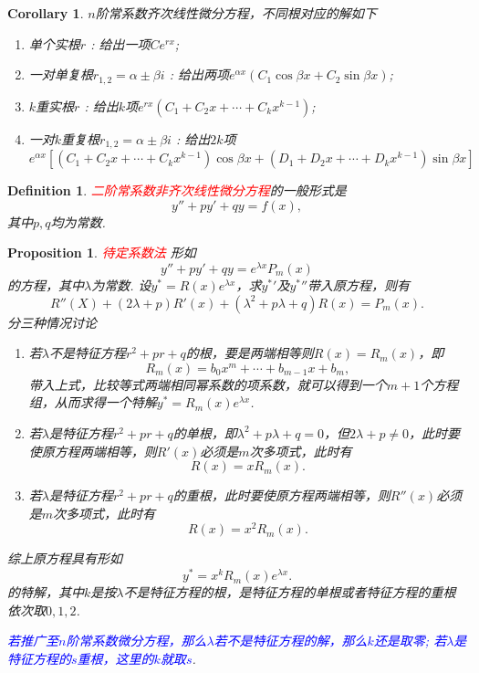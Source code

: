 \documentclass{article}
\newtheorem{corollary}[theorem]{Corollary}
\newtheorem{proposition}[theorem]{Proposition}
\newtheorem{definition}[theorem]{Definition}
\newcommand{\redt}[1]{\textcolor{red}{#1}}
\newcommand{\bluet}[1]{\textcolor{blue}{#1}}
\begin{document}
\begin{corollary}
\rm $n$阶常系数齐次线性微分方程，不同根对应的解如下
\begin{enumerate}
	\item 单个实根$r$ : 给出一项$Ce^{rx}$;
	\item 一对单复根$r_{1,2} = \alpha \pm \beta i$ : 给出两项$e^{\alpha x}(C_1\cos \beta x + C_2\sin \beta x)$;
	\item $k$重实根$r$ : 给出$k$项$e^{rx}(C_1 + C_2x + \cdots + C_kx^{k-1})$;
	\item 一对$k$重复根$r_{1,2} = \alpha \pm \beta i$ : 给出$2k$项$e^{\alpha x}[(C_1+C_2x +\cdots +C_kx^{k-1})\cos \beta x + (D_1+D_2x +\cdots +D_kx^{k-1})\sin \beta x]$
\end{enumerate}
\end{corollary}

\begin{definition}
\rm \redt{二阶常系数非齐次线性微分方程}的一般形式是
$$
y''+py' +qy = f(x),
$$
其中$p,q$均为常数. 
\end{definition}

\begin{proposition}
\rm \redt{待定系数法} 形如
$$
y''+py' +qy = e^{\lambda x}P_m(x)
$$
的方程，其中$\lambda$为常数. 设$y^* = R(x)e^{\lambda x}$，求${y^*}'$及${y^*}''$带入原方程，则有
$$
R''(X) + (2\lambda + p)R'(x) + (\lambda^2 + p\lambda +q)R(x) = P_m(x).
$$
分三种情况讨论
\begin{enumerate}
	\item 若$\lambda$不是特征方程$r^2+pr+q$的根，要是两端相等则$R(x) = R_m(x)$，即
	$$
	R_m(x) = b_0 x^{m} + \cdots + b_{m-1}x+ b_m,
	$$ 
	带入上式，比较等式两端相同幂系数的项系数，就可以得到一个$m+1$个方程组，从而求得一个特解$y^* = R_m(x)e^{\lambda x}$. 
	\item 若$\lambda$是特征方程$r^2 + pr+ q$的单根，即$\lambda^2 + p\lambda +q =0$，但$2\lambda+p \neq 0$，此时要使原方程两端相等，则$R'(x)$必须是$m$次多项式，此时有
	$$
	R(x) = xR_m(x).
	$$
	\item 若$\lambda$是特征方程$r^2 + pr + q$的重根，此时要使原方程两端相等，则$R''(x)$必须是$m$次多项式，此时有
	$$
	R(x) = x^2R_m(x).
	$$
\end{enumerate}
综上原方程具有形如
$$
y^* = x^kR_m(x)e^{\lambda x}.
$$
的特解，其中$k$是按$\lambda$不是特征方程的根，是特征方程的单根或者特征方程的重根依次取$0,1,2$. 

\bluet{若推广至$n$阶常系数微分方程，那么$\lambda$若不是特征方程的解，那么$k$还是取零; 若$\lambda$是特征方程的$s$重根，这里的$k$就取$s$}. 
\end{proposition}
\end{document}

